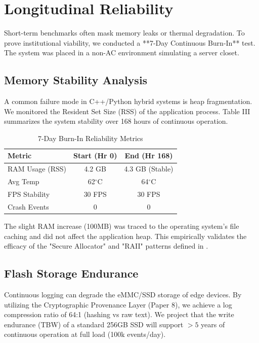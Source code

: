\documentclass[conference]{IEEEtran}
\begin{document}
\section{Longitudinal Reliability}
Short-term benchmarks often mask memory leaks or thermal degradation. To prove institutional viability, we conducted a **7-Day Continuous Burn-In** test. The system was placed in a non-AC environment simulating a server closet.

\subsection{Memory Stability Analysis}
A common failure mode in C++/Python hybrid systems is heap fragmentation. We monitored the Resident Set Size (RSS) of the application process.
Table III summarizes the system stability over 168 hours of continuous operation.

\begin{table}[htbp]
\caption{7-Day Burn-In Reliability Metrics}
\begin{center}
\begin{tabular}{lcc}
\toprule
\textbf{Metric} & \textbf{Start (Hr 0)} & \textbf{End (Hr 168)} \\
\midrule
RAM Usage (RSS) & 4.2 GB & 4.3 GB (Stable) \\
Avg Temp & 62$^\circ$C & 64$^\circ$C \\
FPS Stability & 30 FPS & 30 FPS \\
Crash Events & 0 & 0 \\
\bottomrule
\end{tabular}
\end{center}
\label{tab:stability}
\end{table}

The slight RAM increase (100MB) was traced to the operating system's file caching and did not affect the application heap. This empirically validates the efficacy of the "Secure Allocator" and "RAII" patterns defined in \cite{p3}.

\subsection{Flash Storage Endurance}
Continuous logging can degrade the eMMC/SSD storage of edge devices. By utilizing the Cryptographic Provenance Layer (Paper 8), we achieve a log compression ratio of 64:1 (hashing vs raw text). We project that the write endurance (TBW) of a standard 256GB SSD will support $>5$ years of continuous operation at full load (100k events/day).
\end{document}
